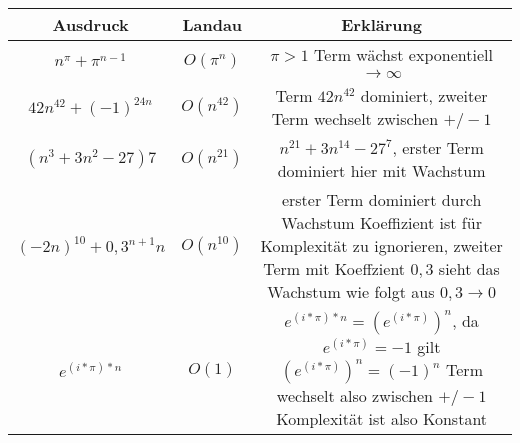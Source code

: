 \documentclass[a4paper, 10pt]{article}
\begin{document}
\begin{center} 
    \begin{tabular}{c|c|c} 
     \hline
     Ausdruck & Landau & Erklärung \\ [0.5ex] 
     \hline\hline
     $n^{\pi}+\pi^{n-1}$ & $O(\pi^{n})$ & $\pi > 1$ Term wächst exponentiell $\xrightarrow{} \infty$\\ 
     \hline
     $42n^{42}+(-1)^{24n}$ & $O(n^{42})$ & Term $42n^{42}$ dominiert, zweiter Term wechselt zwischen $+/-1$\\
     \hline
     $(n^{3}+3n^{2}-27)7$ & $O(n^{21})$ & $n^{21}+3n^{14}-27^{7}$, erster Term dominiert hier mit Wachstum\\
     \hline
     $(-2n)^{10}+0,3^{n+1}n$ & $O(n^{10})$ & \makecell{erster Term dominiert durch Wachstum\\ Koeffizient ist für Komplexität zu ignorieren,\\ zweiter Term mit Koeffzient $0,3$ sieht das Wachstum wie folgt aus $0,3 \xrightarrow{} 0$}\\
     \hline
     $e^{(i*\pi)*n}$ & $O(1)$ & \makecell{$e^{(i*\pi)*n} = (e^{(i*\pi)})^{n}$,\\ da $e^{(i*\pi)} = -1$ gilt $(e^{(i*\pi)})^{n} = (-1)^{n}$\\ Term wechselt also zwischen $+/-1$ Komplexität ist also Konstant}\\
     \hline
    \end{tabular}
\end{center}
\end{document}
